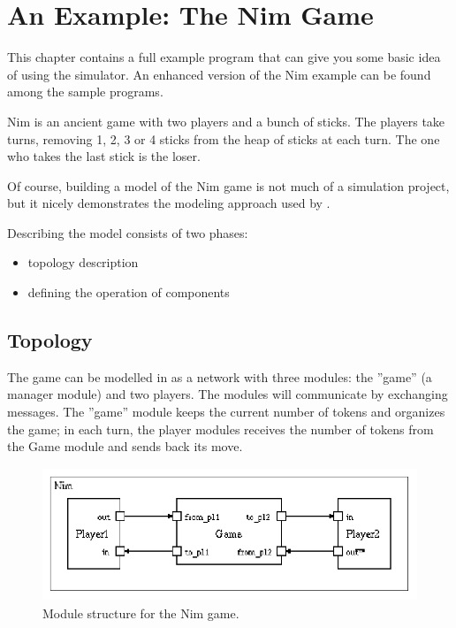 \chapter{An Example: The Nim Game}
\label{cha:the-nim-game}


This chapter contains a full example program that can give you
some basic idea of using the simulator. An enhanced version of
the Nim example can be found among the sample programs.

Nim is an ancient game with two players and a bunch of sticks.
The players take turns, removing 1, 2, 3 or 4 sticks from the
heap of sticks at each turn. The one who takes the last stick
is the loser.


Of course, building a model of the Nim game is not much of a
simulation project, but it nicely demonstrates the modeling approach
used by {\opp}.


Describing the model consists of two phases:
\begin{itemize}
\item{topology description}
\item{defining the operation of components}
\end{itemize}



\section{Topology}

The game can be modelled in {\opp} as a network with three modules:
the ''game'' (a manager module) and two players.
The modules will communicate by exchanging messages. The ''game''
module keeps the current number of tokens and organizes the game;
in each turn, the player modules receives the number of tokens
from the Game module and sends back its move.

\begin{figure}[htbp]
\begin{center}
\includegraphics[width=4.483in, height=1.568in]{figures/usmanFig6}
\caption{Module structure for the Nim game.}
\end{center}
\end{figure}

